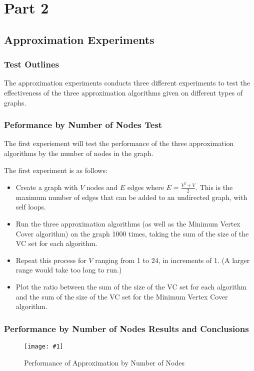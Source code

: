 \documentclass[12pt]{article}
\newcommand{\firgureBuffered}[2]
{
    \begin{figure}[ht!]
        \centering
        \texttt{[image: \#1]}
        \caption{#2}
    \end{figure}
}
\begin{document}
\section{Part 2}
\subsection{Approximation Experiments}

\subsubsection{Test Outlines}

The approximation experiments conducts three different experiments to test the effectiveness of the three approximation algorithms given on different types of graphs.

\subsubsection{Peformance by Number of Nodes Test}

The first experiement will test the performance of the three approximation algorithms by the number of nodes in the graph.

The first experiment is as follows: 

\begin{itemize}
    \item Create a graph with $V$ nodes and $E$ edges where $E = \frac{V^2 + V}{2}$. This is the maximum number of edges that can be added to an undirected graph, with self loops.
    \item Run the three approximation algorithms (as well as the Minimum Vertex Cover algorithm) on the graph 1000 times, taking the sum of the size of the VC set for each algorithm.
    \item Repeat this process for $V$ ranging from 1 to 24, in increments of 1. (A larger range would take too long to run.)
    \item Plot the ratio between the sum of the size of the VC set for each algorithm and the sum of the size of the VC set for the Minimum Vertex Cover algorithm.
\end{itemize}
\newpage
\subsubsection{Performance by Number of Nodes Results and Conclusions}

\FloatBarrier{}
\firgureBuffered{images/approxexperiments/Nodes.png}{Performance of Approximation by Number of Nodes}
\FloatBarrier{}
\end{document}

